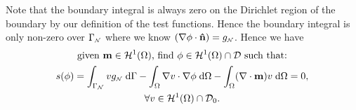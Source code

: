 Note that the boundary integral is always zero on the Dirichlet region of the boundary by our definition of the test functions. Hence the boundary integral is only non-zero over ${\Gamma}_{{\scriptscriptstyle{\mathcal{N}}}}$ where we know $(\nabla \phi \cdot \mathbf{\hat{n}}) = g_{{\scriptscriptstyle{\mathcal{N}}}}$. Hence we have
\begin{gather}
  \text{given $\mathbf{m} \in \mathcal{H}^1(\Omega)$, find $\phi \in \mathcal{H}^1(\Omega) \cap \mathcal{D}$ such that:} \notag \\
  s(\phi) = \int_{{\Gamma}_{\scriptscriptstyle{\mathcal{N}}}} v g_{\scriptscriptstyle{\mathcal{N}}} {\; \text{d}} {\Gamma}
  - \int_\Omega \nabla v \cdot \nabla \phi {\; \text{d}} \Omega
  - \int_\Omega (\nabla \cdot \mathbf{m}) v {\; \text{d}} \Omega = 0
  , \label{res:contphi} \\
  \forall v \in \mathcal{H}^1(\Omega) \cap \mathcal{D}_0. \notag
\end{gather}





